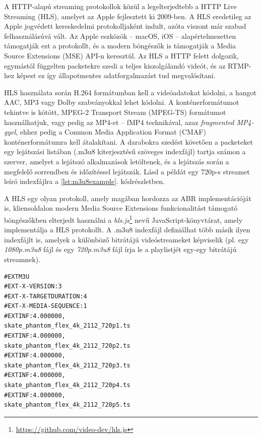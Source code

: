 A HTTP-alapú streaming protokollok közül a legelterjedtebb a HTTP Live Streaming (HLS), amelyet az Apple fejlesztett ki 2009-ben. A HLS eredetileg az Apple jogvédett kereskedelmi protokolljaként indult, azóta viszont már szabad felhasználásúvá vált. Az Apple eszközök -- macOS, iOS -- alapértelmezetten támogatják ezt a protokollt, és a modern böngészők is támogatják a Media Source Extensions (MSE) API-n keresztül. Az HLS a HTTP felett dolgozik, egymástól függelten packetekre szedi a teljes kiszolgálandó videót, és az RTMP-hez képest ez így állapotmentes adatforgalmazást tud megvalósítani. \cite{StreamingHistory}

HLS használata során H.264 formátumban kell a videóadatokat kódolni, a hangot AAC, MP3 vagy Dolby szabványokkal lehet kódolni. A konténerformátumot tekintve is kötött, MPEG-2 Transport Stream (MPEG-TS) formátumot használhatjuk, vagy pedig az MP4-et -- fMP4 technikával, azaz \emph{fragmented MP4-gyel}, ehhez pedig a Common Media Application Format (CMAF) konténerformátumra kell átalakítani. \cite{Cmaf} A darabokra szedést követően a packeteket egy lejátszási listában (.m3u8 kiterjesztésű szöveges indexfájl) tartja számon a szerver, amelyet a lejátszó alkalmazások letöltenek, és a lejátszás során a megfelelő sorrendben és időzítéssel lejátszák. \cite{HlsApple} Lásd a példát egy 720p-s streamet leíró indexfájlra a \ref{lst:m3u8example}. kódrészletben.

A HLS egy olyan protokoll, amely magában hordozza az ABR implementációját is, kliensoldalon modern Media Source Extensions funkcionalitást támogató böngészőkben elterjedt használni a \emph{hls.js}\footnote{\url{https://github.com/video-dev/hls.js}} nevű JavaScript-könyvtárat, amely implementálja a HLS protokollt. A .m3u8 indexfájl definiálhat több másik ilyen indexfájlt is, amelyek a különböző bitrátájú videóstreameket képviselik (pl. egy \emph{1080p.m3u8} fájl és egy \emph{720p.m3u8} fájl írja le a playlistjét egy-egy bitrátájú streamnek).

\vspace{0.4cm}
\begin{lstlisting}[caption=Részlet egy .m3u8 indexfájlból.,label=lst:m3u8example,basicstyle=\small,]
#EXTM3U
#EXT-X-VERSION:3
#EXT-X-TARGETDURATION:4
#EXT-X-MEDIA-SEQUENCE:1
#EXTINF:4.000000,
skate_phantom_flex_4k_2112_720p1.ts
#EXTINF:4.000000,
skate_phantom_flex_4k_2112_720p2.ts
#EXTINF:4.000000,
skate_phantom_flex_4k_2112_720p3.ts
#EXTINF:4.000000,
skate_phantom_flex_4k_2112_720p4.ts
#EXTINF:4.000000,
skate_phantom_flex_4k_2112_720p5.ts
\end{lstlisting}

